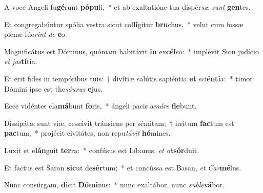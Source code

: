 \item A voce Angeli fu\textbf{gé}runt \textbf{pó}\textbf{pu}li,~* et ab exaltatióne tua dispér\textit{sæ} \textit{sunt} \textbf{gen}tes.
\item Et congregabúntur spólia vestra sicut col\textbf{lí}gitur \textbf{bru}chus,~* velut cum fossæ plenæ fúe\textit{rint} \textit{de} \textbf{e}o.
\item Magnificátus est Dóminus, quóniam habitávit \textbf{in} ex\textbf{cél}so:~* implévit Sion judício \textit{et} \textit{jus}\textbf{tí}tia.
\item Et erit fides in tempóribus tuis:~† divítiæ salútis sapiéntia \textbf{et} sci\textbf{én}\textbf{ti}a:~* timor Dómini ipse est the\textit{sáu}\textit{rus} \textbf{e}jus.
\item Ecce vidéntes cla\textbf{má}bunt \textbf{fo}ris,~* ángeli pacis a\textit{má}\textit{re} \textbf{fle}bunt.
\item Dissipátæ sunt viæ, cessávit tránsiens per sémitam;~† irritum \textbf{fac}tum est \textbf{pac}tum,~* projécit civitátes, non repu\textit{tá}\textit{vit} \textbf{hó}mines.
\item Luxit et e\textbf{lán}guit \textbf{ter}ra:~* confúsus est Líbanus, \textit{et} \textit{ob}\textbf{sór}duit.
\item Et factus est Saron \textbf{sic}ut de\textbf{sér}tum;~* et concússa est Basan, \textit{et} \textit{Car}\textbf{mé}lus.
\item Nunc consúrgam, \textbf{di}cit \textbf{Dó}\textbf{mi}nus:~* nunc exaltábor, nunc \textit{sub}\textit{le}\textbf{vá}bor.
